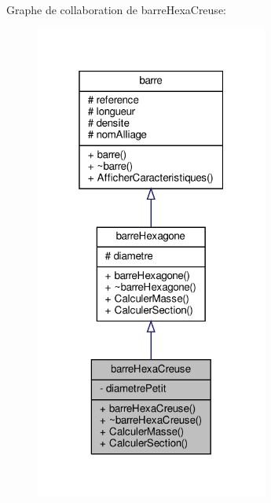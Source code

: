 Graphe de collaboration de barre\+Hexa\+Creuse\+:
\nopagebreak
\begin{figure}[H]
\begin{center}
\leavevmode
\includegraphics[width=217pt]{classbarre_hexa_creuse__coll__graph}
\end{center}
\end{figure}
